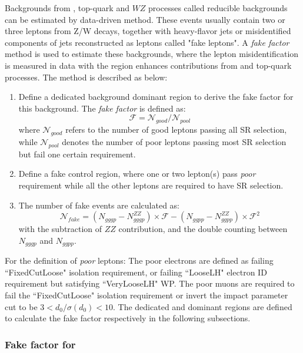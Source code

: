 Backgrounds from \Zjet, top-quark and $WZ$ processes called reducible backgrounds can be estimated by data-driven method.
These events usually contain two or three leptons from Z/W decays, together with heavy-flavor jets or misidentified components of jets reconstructed as leptons called "fake leptons".
A \textit{fake factor} method is used to estimate these backgrounds, where the lepton misidentification is measured in data 
with the region enhances contributions from \Zjet and top-quark processes.
The method is described as below:
\begin{enumerate}
	\item Define a dedicated background dominant region to derive the fake factor for this background. 
The \textit{fake factor} is defined as:
\begin{equation}
	\mathcal{F} = \mathcal{N}_{good} / \mathcal{N}_{pool}
\end{equation}
where $\mathcal{N}_{good}$ refers to the number of good leptons passing all SR selection, while $\mathcal{N}_{pool}$ denotes the number of poor leptons passing most SR selection but fail one certain requirement.
	\item Define a fake control region, where one or two lepton(s) pass \textit{poor} requirement while all the other leptons are required to have SR selection.
	\item The number of fake events are calculated as:
\begin{equation}
	\mathcal{N}_{fake} = \left( N_{gggp} - N_{gggp}^{ZZ} \right) \times \mathcal{F} - \left( N_{ggpp} - N_{ggpp}^{ZZ} \right) \times \mathcal{F}^{2}
\end{equation}
with the subtraction of $ZZ$ contribution, and the double counting between $N_{gggp}$ and $N_{ggpp}$.
\end{enumerate}

For the definition of \textit{poor} leptons:
The poor electrons are defined as failing ``FixedCutLoose" isolation requirement, or failing ``LooseLH" electron ID requirement but satisfying ``VeryLooseLH" WP.
The poor muons are required to fail the ``FixedCutLoose" isolation requirement or invert the impact parameter cut to be $3 < d_{0}/\sigma(d_{0}) < 10$.
The dedicated \Zjet and \ttbar dominant regions are defined to calculate the fake factor respectively in the following subsections.

\subsubsection{Fake factor for \Zjet}

